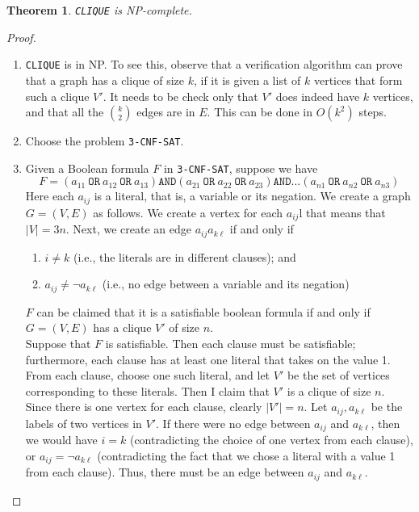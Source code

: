\documentclass[12pt]{article}
\theoremstyle{plain}
\newtheorem{theorem}{Theorem}[subsection]
\theoremstyle{definition}
\begin{document}
\begin{theorem}
\texttt{CLIQUE} is NP-complete.
\end{theorem}
\begin{proof}
\begin{enumerate}
  \item[1.] \texttt{CLIQUE} is in NP.
  To see this, observe that a verification algorithm can prove that a graph has a clique of size $k$, if it is given a list of $k$ vertices that form such a clique $V'$.
  It needs to be check only that $V'$ does indeed have $k$ vertices, and that all the ${k \choose 2}$ edges are in $E$.
  This can be done in $O(k^{2})$ steps.

  \item[2.] Choose the problem \texttt{3-CNF-SAT}.

  \item[3.] Given a Boolean formula $F$ in \texttt{3-CNF-SAT}, suppose we have
  $$F = (a_{11}~\texttt{OR}~a_{12}~\texttt{OR}~a_{13})\texttt{AND}(a_{21}~\texttt{OR}~a_{22}~\texttt{OR}~a_{23})\texttt{AND}\dots(a_{n1}~\texttt{OR}~a_{n2}~\texttt{OR}~a_{n3})$$
  Here each $a_{ij}$ is a literal, that is, a variable or its negation.
  We create a graph $G = (V, E)$ as follows.
  We create a vertex for each $a_{ij}$l
  that means that $|V| = 3n$.
  Next, we create an edge $a_{ij}a_{k\ell}$ if and only if
  \begin{enumerate}
    \item $i \neq k$ (i.e., the literals are in different clauses); and
    \item $a_{ij} \neq \neg a_{k\ell}$ (i.e., no edge between a variable and its negation)
  \end{enumerate}
  $F$ can be claimed that it is a satisfiable boolean formula if and only if $G = (V, E)$ has a clique $V'$ of size $n$. \\

  Suppose that $F$ is satisfiable.
  Then each clause must be satisfiable;
  furthermore, each clause has at least one literal that takes on the value 1.
  From each clause, choose one such literal, and let $V'$ be the set of vertices corresponding to these literals.
  Then I claim that $V'$ is a clique of size $n$.
  Since there is one vertex for each clause, clearly $|V'| = n$.
  Let $a_{ij}, a_{k\ell}$ be the labels of two vertices in $V'$.
  If there were no edge between $a_{ij}$ and $a_{k\ell}$, then we would have $i = k$ (contradicting the choice of one vertex from each clause), or $a_{ij} = \neg a_{k\ell}$ (contradicting the fact that we chose a literal with a value 1 from each clause).
  Thus, there must be an edge between $a_{ij}$ and $a_{k\ell}$. \\


\end{enumerate}
\end{proof}
\end{document}
